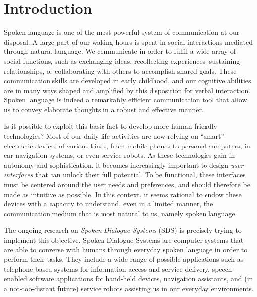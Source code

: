 
\chapter{Introduction}

Spoken language is one of the most powerful system of communication at our disposal. A large part of our waking hours is spent in social interactions mediated through natural language.  We communicate in order to fulfil a wide array of social functions, such as exchanging ideas, recollecting experiences,  sustaining relationships, or collaborating with others to accomplish shared goals. These communication skills are developed in early childhood, and our cognitive abilities are in many ways shaped and amplified by this disposition for verbal interaction.  Spoken language is indeed a remarkably efficient communication tool that allow us to convey elaborate thoughts in a robust and effective manner. 

Is it possible to exploit this basic fact to develop more human-friendly technologies? Most of our daily life activities are now relying on ``smart'' electronic devices of various kinds, from mobile phones to personal computers, in-car navigation systems, or even service robots. As these technologies gain in autonomy and sophistication, it becomes increasingly important to design \textit{user interfaces} that can unlock their full potential.  To be functional, these interfaces must be centered around the user needs and preferences, and should therefore be made as intuitive as possible. In this context, it seems rational to endow these devices with a capacity to understand, even in a limited manner, the communication medium that is most natural to us, namely spoken language.  

The ongoing research on \textit{Spoken Dialogue Systems} (SDS) is precisely trying to implement this objective. Spoken Dialogue Systems are computer systems that are able to converse with humans through everyday spoken language in order to perform their tasks.  They include a wide range of possible applications such as telephone-based systems for information access and service delivery, speech-enabled software applications for hand-held devices, navigation assistants, and (in a not-too-distant future) service robots assisting us in our everyday environments.   

